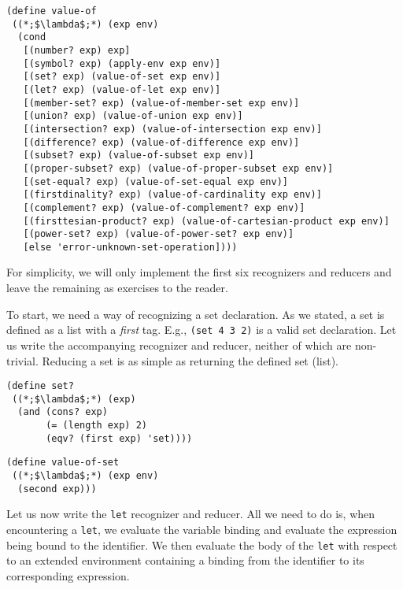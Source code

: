 \begin{cl}[]{}\begin{lstlisting}[language=MyScheme]
(define value-of
 ((*;$\lambda$;*) (exp env)
  (cond
   [(number? exp) exp] 
   [(symbol? exp) (apply-env exp env)]
   [(set? exp) (value-of-set exp env)] 
   [(let? exp) (value-of-let exp env)]
   [(member-set? exp) (value-of-member-set exp env)] 
   [(union? exp) (value-of-union exp env)]
   [(intersection? exp) (value-of-intersection exp env)] 
   [(difference? exp) (value-of-difference exp env)]
   [(subset? exp) (value-of-subset exp env)] 
   [(proper-subset? exp) (value-of-proper-subset exp env)]
   [(set-equal? exp) (value-of-set-equal exp env)] 
   [(firstdinality? exp) (value-of-cardinality exp env)]
   [(complement? exp) (value-of-complement? exp env)] 
   [(firsttesian-product? exp) (value-of-cartesian-product exp env)]
   [(power-set? exp) (value-of-power-set? exp env)]
   [else 'error-unknown-set-operation])))
\end{lstlisting}\end{cl}

For simplicity, we will only implement the first six recognizers and reducers and leave the remaining as exercises to the reader.

To start, we need a way of recognizing a set declaration. As we stated, a set is defined as a list with a \textit{first} tag. E.g., \texttt{(set {4 3 2})} is a valid set declaration. Let us write the accompanying recognizer and reducer, neither of which are non-trivial. Reducing a set is as simple as returning the defined set (list).

\begin{clrr}[]{}
\begin{lstlisting}[language=MyScheme]
(define set?
 ((*;$\lambda$;*) (exp)
  (and (cons? exp)
       (= (length exp) 2)
       (eqv? (first exp) 'set))))
\end{lstlisting}
\tcblower
\begin{lstlisting}[language=MyNLNScheme]
(define value-of-set
 ((*;$\lambda$;*) (exp env)
  (second exp)))
\end{lstlisting}
\end{clrr}

Let us now write the \texttt{let} recognizer and reducer. All we need to do is, when encountering a \texttt{let}, we evaluate the variable binding and evaluate the expression being bound to the identifier. We then evaluate the body of the \texttt{let} with respect to an extended environment containing a binding from the identifier to its corresponding expression.

